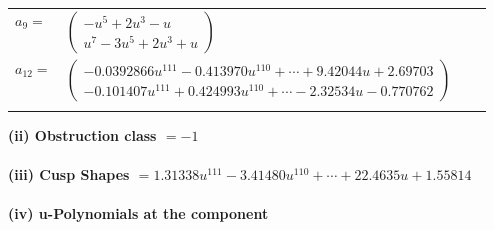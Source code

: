 \documentclass[1p]{elsarticle_modified}
\theoremstyle{definition}
\begin{document}
\begin{tabular}{m{7pt} m{180pt} m{7pt} m{180pt} }
\flushright $a_{9}=$&$\begin{pmatrix}- u^5+2 u^3- u\\u^7-3 u^5+2 u^3+u\end{pmatrix}$ \\
\flushright $a_{12}=$&$\begin{pmatrix}-0.0392866 u^{111}-0.413970 u^{110}+\cdots+9.42044 u+2.69703\\-0.101407 u^{111}+0.424993 u^{110}+\cdots-2.32534 u-0.770762\end{pmatrix}$\\&\end{tabular}
\flushleft \textbf{(ii) Obstruction class $= -1$}\\~\\
\flushleft \textbf{(iii) Cusp Shapes $= 1.31338 u^{111}-3.41480 u^{110}+\cdots+22.4635 u+1.55814$}\\~\\
\newpage\renewcommand{\arraystretch}{1}
\flushleft \textbf{(iv) u-Polynomials at the component}\newline \\
\end{document}
